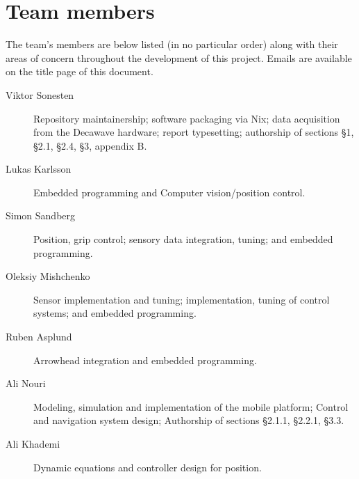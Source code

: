 \section{Team members}
The team's members are below listed (in no particular order) along with their areas of concern throughout the development of this project.
Emails are available on the title page of this document.

\begin{description}
\item[Viktor Sonesten] Repository maintainership; software packaging
  via Nix; data acquisition from the Decawave hardware; report
  typesetting; authorship of sections §1, §2.1, §2.4, §3, appendix B.

    \item[Lukas Karlsson]
    Embedded programming and
    Computer vision/position control.

    \item[Simon Sandberg]
    Position, grip control;
    sensory data integration, tuning; and
    embedded programming.

    \item[Oleksiy Mishchenko]
    Sensor implementation and tuning;
    implementation, tuning of control systems; and
    embedded programming.

    \item[Ruben Asplund]
    Arrowhead integration and embedded programming.

    \item[Ali Nouri]
    Modeling, simulation and implementation of the mobile platform;
    Control and navigation system design;
    Authorship of sections §2.1.1, §2.2.1, §3.3.  

    \item[Ali Khademi]
    Dynamic equations and controller design for position.
\end{description}

